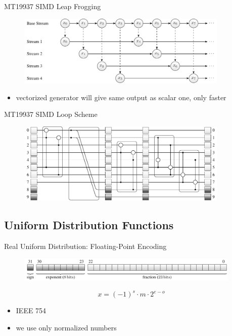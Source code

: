 \documentclass[aspectratio=169]{beamer}
\begin{document}
    \begin{frame}{MT19937 SIMD Leap Frogging}
      \begin{figure}
        \includegraphics[width=0.9\textwidth]{figures/leapfrogging_multiple_streams.pdf}
      \end{figure}
      \begin{itemize}
        \item vectorized generator will give same output as scalar one, only faster
      \end{itemize}
    \end{frame}

    \begin{frame}{MT19937 SIMD Loop Scheme}
      \begin{figure}
        \includegraphics[width=0.9\textwidth]{figures/mt19937_vector_loop_scheme.pdf}
      \end{figure}
    \end{frame}

    \subsection{Uniform Distribution Functions}
    \begin{frame}{Real Uniform Distribution: Floating-Point Encoding}
      \begin{figure}
        \includegraphics[width=0.95\textwidth]{figures/floating-point_encoding_single.pdf}
      \end{figure}
      \begin{mybox}
        \[
          x = (-1)^s \cdot m \cdot 2^{e - o}
        \]
      \end{mybox}
      \begin{itemize}
        \item IEEE 754
        \item we use only normalized numbers
      \end{itemize}
    \end{frame}
\end{document}
